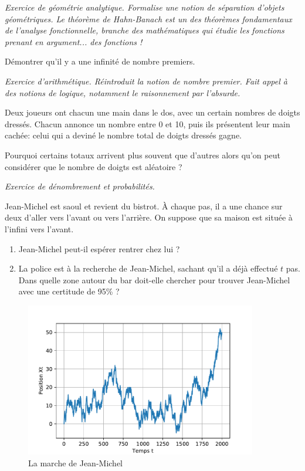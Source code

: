 \documentclass[12pt]{article}
\theoremstyle{definition}
\begin{document}
\textit{Exercice de géométrie analytique. Formalise une notion de séparation d'objets géométriques. Le théorème de Hahn-Banach est un des théorèmes fondamentaux de l'analyse fonctionnelle, branche des mathématiques qui étudie les fonctions prenant en argument... des fonctions !}

\begin{exer}
	Démontrer qu'il y a une infinité de nombre premiers.
\end{exer}

\textit{Exercice d'arithmétique. Réintroduit la notion de nombre premier. Fait appel à des notions de logique, notamment le raisonnement par l'absurde.}


\begin{exer}[La mourre]
	Deux joueurs ont chacun une main dans le dos, avec un certain nombres de doigts dressés. Chacun annonce un nombre entre 0 et 10, puis ils présentent leur main cachée: celui qui a deviné le nombre total de doigts dressés gagne.
	
	Pourquoi certains totaux arrivent plus souvent que d'autres alors qu'on peut considérer que le nombre de doigts est aléatoire ?
\end{exer}

\textit{Exercice de dénombrement et probabilités.}

\begin{exer}
Jean-Michel est saoul et revient du bistrot. À chaque pas, il a une chance sur deux d'aller vers l'avant ou vers l'arrière. On suppose que sa maison est située à l'infini vers l'avant.
\begin{enumerate}
	\item Jean-Michel peut-il espérer rentrer chez lui ?
	\item La police est à la recherche de Jean-Michel, sachant qu'il a déjà effectué $t$ pas. Dans quelle zone autour du bar doit-elle chercher pour trouver Jean-Michel avec une certitude de 95\% ?
\end{enumerate}	

\end{exer}

\begin{figure}[!ht]
	\includegraphics[width=0.9\textwidth]{../marcheJM.pdf}
	\caption{La marche de Jean-Michel}
\end{figure}
\end{document}

